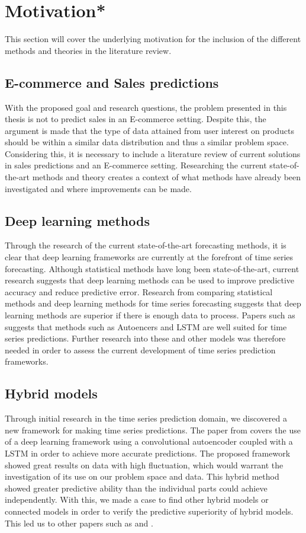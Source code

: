 \section{Motivation*}
\label{section:BT:Motivation}

This section will cover the underlying motivation for the inclusion of the different methods and theories in the literature review.


\subsection{E-commerce and Sales predictions}
With the proposed goal and research questions, the problem presented in this thesis is not to predict sales in an E-commerce setting.
Despite this, the argument is made that the type of data attained from user interest on products should be within a similar data distribution and thus a similar problem space.
Considering this, it is necessary to include a literature review of current solutions in sales predictions and an E-commerce setting.
Researching the current state-of-the-art methods and theory creates a context of what methods have already been investigated and where improvements can be made.


\subsection{Deep learning methods}
Through the research of the current state-of-the-art forecasting methods,
it is clear that deep learning frameworks are currently at the forefront of time series forecasting.
Although statistical methods have long been state-of-the-art, current research suggests that deep learning methods can be used to improve predictive accuracy and reduce predictive error.
Research from \cite{Makridakis2018} comparing statistical methods and deep learning methods for time series forecasting suggests that deep learning methods are superior if there is enough data to process.
Papers such as \cite{Laptev} suggests that methods such as Autoencers and LSTM are well suited for time series predictions.
Further research into these and other models was therefore needed in order to assess the current development of time series prediction frameworks.


\subsection{Hybrid models}
Through initial research in the time series prediction domain,
we discovered a new framework for making time series predictions.
The paper from \cite{Zhao2019} covers the use of a deep learning framework using a convolutional autoencoder
coupled with a LSTM in order to achieve more accurate predictions.
The proposed framework showed great results on data with high fluctuation,
which would warrant the investigation of its use on our problem space and data.
This hybrid method showed greater predictive ability than the individual parts could achieve independently.
With this, we made a case to find other hybrid models or connected models in order to verify the predictive superiority of hybrid models.
This led us to other papers such as \cite{Khan2020} and \cite{Bowen2020}.

